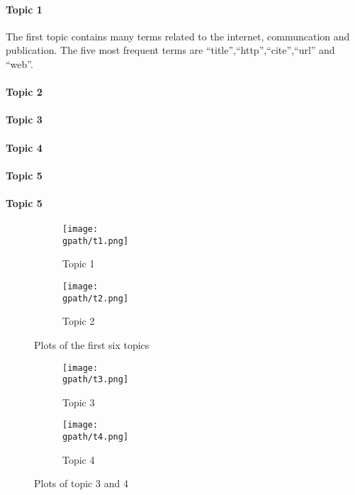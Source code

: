 \documentclass[12 pt,twopage]{article}
\begin{document}
\paragraph{Topic 1}
The first topic contains many terms related to the internet, communcation and publication. The five most frequent terms are \enquote{title},\enquote{http},\enquote{cite},\enquote{url} and \enquote{web}.
\paragraph{Topic 2}
\paragraph{Topic 3}
\paragraph{Topic 4}
\paragraph{Topic 5}
\paragraph{Topic 5}


\begin{figure}
 \begin{subfigure}[c]{1\textwidth}
  \caption{Topic 1}
  \centering
  \texttt{[image: \\gpath/t1.png]}
 \end{subfigure}
 \begin{subfigure}[c]{1\textwidth}
  \caption{Topic 2}
  \centering
  \texttt{[image: \\gpath/t2.png]}
 \end{subfigure}
 \caption{Plots of the first six topics}
 \label{fig:t12}
\end{figure}


\begin{figure}
 \begin{subfigure}[c]{1\textwidth}
  \caption{Topic 3}
  \centering
  \texttt{[image: \\gpath/t3.png]}
 \end{subfigure}
 \begin{subfigure}[c]{1\textwidth}
  \caption{Topic 4}
  \centering
  \texttt{[image: \\gpath/t4.png]}
 \end{subfigure}
 \caption{Plots of topic 3 and 4}
 \label{fig:t34}
\end{figure}
\end{document}
